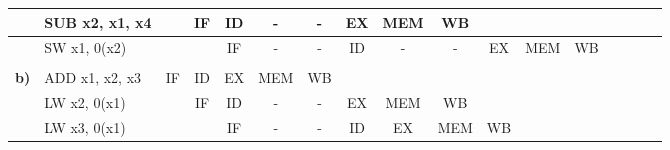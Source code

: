 \documentclass{article}
\begin{document}
\begin{table}[h]
{\begin{tabular}{|l|l|l|l|c|c|c|c|c|c|l|l|l|l|l|l|l|}
                                             & SUB x2, x1, x4        &                         & \multicolumn{1}{c|}{IF} & ID                    & -                     & -                     & EX                    & MEM                   & WB                    &                         &                          &                          &                          &                         &                          &                         \\ \hline
    \textbf{}                                & SW  x1, 0(x2)         &                         &                         & IF                    & -                     & -                     & ID                    & -                     & -                     & \multicolumn{1}{c|}{EX} & \multicolumn{1}{c|}{MEM} & \multicolumn{1}{c|}{WB}  & \multicolumn{1}{c|}{}    &                         &                          &                         \\ \hline
                                             &                       &                         &                         & \multicolumn{1}{l|}{} & \multicolumn{1}{l|}{} & \multicolumn{1}{l|}{} & \multicolumn{1}{l|}{} & \multicolumn{1}{l|}{} & \multicolumn{1}{l|}{} &                         &                          &                          &                          &                         &                          &                         \\ \hline
    \textbf{b)}                              & ADD x1, x2, x3        & \multicolumn{1}{c|}{IF} & \multicolumn{1}{c|}{ID} & EX                    & MEM                   & WB                    & \multicolumn{1}{l|}{} & \multicolumn{1}{l|}{} & \multicolumn{1}{l|}{} &                         &                          &                          &                          &                         &                          &                         \\ \hline
                                             & LW  x2, 0(x1)         &                         & \multicolumn{1}{c|}{IF} & ID                    & -                     & -                     & EX                    & MEM                   & WB                    &                         &                          &                          &                          &                         &                          &                         \\ \hline
    \textbf{}                                & LW  x3, 0(x1)         &                         &                         & IF                    & -                     & -                     & ID                    & EX                    & MEM                   & \multicolumn{1}{c|}{WB} &                          &                          &                          &                         &                          &                         \\ \hline

\end{tabular}}
\end{table}
\end{document}
